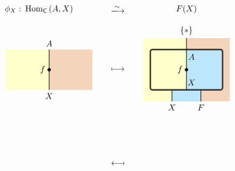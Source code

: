 \[
 \begin{tikzpicture}[x=0.6cm,y=0.6cm, baseline=(current bounding box.center), line width=0.7pt]
    \definecolor{leftcolor}{RGB}{255,255,204}
    \definecolor{midcolor}{HTML}{BBE6FB}
    \definecolor{rightcolor}{HTML}{F5D4BC}
    \node at (-2.5, 6) {$\phi_{X}:$};
    \node at (0, 6) {$\mathrm{Hom}_{\mathsf{C}}\left(A,X\right)$};
    \node at (4.75, 6) {$\xlongrightarrow{\sim}$};
    \node at (4.75, -4.75) {$\longmapsfrom$};
    \node at (4.75, 1.8) {$\longmapsto$};
    \node at (9.5, 6) {$F(X)$};
    
    \begin{scope}[line width=0.7pt]
        \begin{scope}
            \clip (-3,0.4) rectangle (3,3.2);     
            \fill[fill=leftcolor] (-3,0) rectangle (0, 3.2);  
            \fill[fill=rightcolor] (0,0) rectangle (3, 3.2);  
        \end{scope}
        \node[below] at (0, 0.4) {$X$};
        \node[left=1pt] at (0, 1.8) {$f$};
        \draw[fill=black] (0, 1.8) circle (0.1);  
        \draw (0, 3.2) -- (0, 0.4);
        \node[above] at (0, 3.2) {$A$};
    \end{scope}

    \begin{scope}[shift={(9.5,0)}]
    \fill[fill=leftcolor] (-3,-0.4) rectangle (0,4); 
     \fill[fill=rightcolor] (0, -0.4) rectangle (3,4); 
     \fill[fill=midcolor] (-1, -0.4) rectangle (1,2); 
        \begin{scope} 
            \clip (-2.5,0.4) rectangle (2.5,3.2);     
            \fill[fill=leftcolor] (-2.5,0) rectangle (0, 3.2);  
            \fill[fill=midcolor] (0,0) rectangle (2.5, 3.2);  
        \end{scope}
        \draw[line width=1.7pt, color=black!80, rounded corners=2.5pt] (-2.5, 0.4) rectangle (2.5, 3.2); %
        \node[above,shift={(0.35,0.1)}] at (0, 0.4) {$X$};
        \node[left=1pt] at (0, 1.8) {$f$};
        \draw[fill=black] (0, 1.8) circle (0.1);  
        \draw (0, 4) -- (0, 0.4);
        \node[below,shift={(0.35,-0.1)}] at (0, 3.2) {$A$};
        \draw (1, 0.4) -- (1, -0.4);
        \draw (-1, 0.4) -- (-1, -0.4);
        \node[above] at (0, 4) {$\{*\}$};
        \node[below] at (-1, -0.4) {$X$};
        \node[below] at (1, -0.4) {$F$};
    \end{scope}
    

\end{tikzpicture}\]
